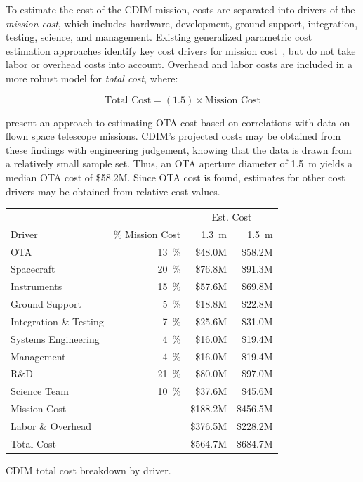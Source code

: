 \documentclass{ws-jai}
\begin{document}
To estimate the cost of the CDIM mission, costs are separated into drivers of the \emph{mission cost}, which includes hardware, development, ground support, integration, testing, science, and management.
Existing generalized parametric cost estimation approaches identify key cost drivers for mission cost~\cite{stahl2013,bely2011}, but do not take labor or overhead costs into account.
Overhead and labor costs are included in a more robust model for \emph{total cost}, where:

\begin{equation}
  	\text{Total Cost}=(1.5)\times\text{Mission Cost}
\label{eq:total-cost}
\end{equation}

\citeauthor{stahl2013} present an approach to estimating OTA cost based on correlations with data on flown space telescope missions.
CDIM's projected costs may be obtained from these findings with engineering judgement, knowing that the data is drawn from a relatively small sample set.
Thus, an OTA aperture diameter of \SI{1.5}{\meter} yields a median OTA cost of \$58.2M.
Since OTA cost is found, estimates for other cost drivers may be obtained from relative cost values.
\begin{wstable}[htp]
  \centering
  \begin{tabular}{@{}lrrr@{}}\toprule
                          &                   & \multicolumn{2}{c}{Est. Cost} \\
    Driver                & \% Mission Cost   & \SI{1.3}{\meter} & \SI{1.5}{\meter} \\ \midrule
    OTA                   & \SI{13}{\percent} & \$48.0M & \$58.2M \\
    Spacecraft            & \SI{20}{\percent} & \$76.8M & \$91.3M \\
    Instruments           & \SI{15}{\percent} & \$57.6M & \$69.8M \\
    Ground Support        & \SI{5}{\percent}  & \$18.8M & \$22.8M \\
    Integration \& Testing & \SI{7}{\percent} & \$25.6M & \$31.0M \\
    Systems Engineering   & \SI{4}{\percent}  & \$16.0M & \$19.4M \\
    Management            & \SI{4}{\percent}  & \$16.0M & \$19.4M \\
    R\&D                  & \SI{21}{\percent} & \$80.0M & \$97.0M \\
    Science Team          & \SI{10}{\percent} & \$37.6M & \$45.6M \\ \midrule
    Mission Cost          &                   & \$188.2M & \$456.5M \\
    Labor \& Overhead     &                   & \$376.5M & \$228.2M \\
    Total Cost            &                   & \$564.7M & \$684.7M \\ \bottomrule
  \end{tabular}
  \caption{CDIM total cost breakdown by driver. 
\label{tab:total-cost}
}
\end{wstable}
\end{document}
